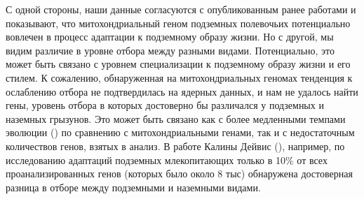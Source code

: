 С одной стороны, наши данные согласуются с опубликованным ранее работами и показывают, что митохондриальный геном подземных полевочьих потенциально вовлечен в процесс адаптации к подземному образу жизни. Но с другой, мы видим различие в уровне отбора между разными видами. Потенциально, это может быть связано с уровнем специализации к подземному образу жизни и его стилем. К сожалению, обнаруженная на митохондриальных геномах тенденция к ослаблению отбора не подтвердилась на ядерных данных, и нам не удалось найти гены, уровень отбора в которых достоверно бы различался у подземных и наземных грызунов. Это может быть связано как с более медленными темпами эволюции (\cite{Lin2004}) по сравнению с митохондриальными генами, так и с недостаточным количествов генов, взятых в анализ. В работе Калины Дейвис (\cite{Davies2018}), например, по исследованию адаптаций подземных млекопитающих только в 10\% от всех проанализированных генов (которых было около 8 тыс) обнаружена достоверная разница в отборе между подземными и наземными видами. 


